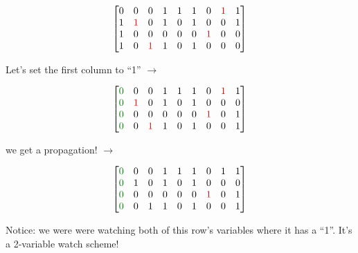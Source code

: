 \documentclass[aspectratio=196]{slides}
\begin{document}
\begin{minipage}{0.3\linewidth}
\[
\begin{bmatrix}
0 &            0 &           0 & 1 & 1 & 1 &            0 & \color{red}1 & 1\\
1 & \color{red}1 &           0 & 1 & 0 & 1 &            0 &            0 & 1\\
1 &            0 &           0 & 0 & 0 & 0 & \color{red}1 &            0 & 0\\
1 &            0 &\color{red}1 & 1 & 0 & 1 &            0 &            0 & 0\\
\end{bmatrix}
\]
\end{minipage}
%
\begin{minipage}{0.3\linewidth}
\centering
Let's set the first column to ``1'' $\rightarrow$
\end{minipage}
%
\begin{minipage}{0.3\linewidth}
\[
\begin{bmatrix}
\color{darkgreen}0 &            0 &           0 & 1 & 1 & 1 &            0 & \color{red}1 & 1\\
\color{darkgreen}0 & \color{red}1 &           0 & 1 & 0 & 1 &            0 &            0 & 0\\
\color{darkgreen}0 &            0 &           0 & 0 & 0 & 0 & \color{red}1 &            0 & 1\\
\color{darkgreen}0 &            0 &\color{red}1 & 1 & 0 & 1 &            0 &            0 & 1\\
\end{bmatrix}
\]
\end{minipage}

\begin{minipage}{0.3\linewidth}
\centering
we get a propagation!
$\rightarrow$
\end{minipage}
\begin{minipage}{0.3\linewidth}
\[
\begin{bmatrix}
\color{darkgreen}0 &            0 &           0 & 1 & 1 & 1 &            0 & 1 & 1\\
\color{darkgreen}0 & 1 &           0 & 1 & 0 & 1 &            0 &            0 & 0\\
\color{darkgreen}0 &            0 &           0 & 0 & 0 & 0 & \color{red}1 &            0 & 1\\
\color{darkgreen}0 &            0 &1 & 1 & 0 & 1 &            0 &            0 & 1\\
\end{bmatrix}
\]
\end{minipage}
\begin{minipage}{0.3\linewidth}
Notice: we were were watching both of this row's variables where it has a ``1''. It's a 2-variable watch scheme!
\end{minipage}
\end{document}

